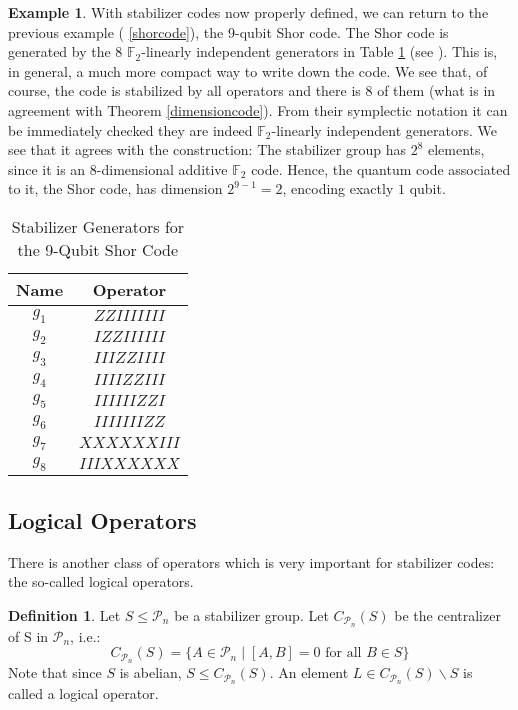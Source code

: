 \documentclass[12pt,a4paper,BCOR15mm,twoside,DIV12]{article}
\def\P{\mathcal{P}}
\def\F{\mathbb{F}}
\theoremstyle{definition}
\newtheorem{ex}[Satz]{Example}
\newtheorem{defn}[Satz]{Definition}
\begin{document}
\begin{ex}\label{shorstab}
With stabilizer codes now properly defined, we can return to the previous example ( \ref{shorcode}), the 9-qubit Shor code. The Shor code is generated by the 8 $\F_2$-linearly independent generators in Table \ref{shorgenerators} (see \cite{NC}). This is, in general, a much more compact way to write down the code. We see that, of course, the code is stabilized by all operators and there is 8 of them (what is in agreement with Theorem  \ref{dimensioncode}). From their symplectic notation it can be immediately checked they are indeed $\F_2$-linearly independent generators.
We see that it agrees with the construction: The stabilizer group has $2^8$ elements, since it is an $8$-dimensional additive $\F_2$ code. Hence, the quantum code associated to it, the Shor code, has dimension $2^{9-1} = 2$, encoding exactly $1$ qubit.
\begin{table}[h]
\centering 
\begin{tabular}{|c|c|}
\hline
Name & Operator \\ \hline
$g_1$ & $ZZIIIIIII$ \\ \hline
$g_2$ & $IZZIIIIII$ \\ \hline
$g_3$ & $IIIZZIIII$ \\ \hline
$g_4$ & $IIIIZZIII$ \\ \hline
$g_5$ & $IIIIIIZZI$ \\ \hline
$g_6$ & $IIIIIIIZZ$ \\ \hline
$g_7$ & $XXXXXXIII$ \\ \hline
$g_8$ & $IIIXXXXXX$ \\ \hline
\end{tabular}
\caption{ Stabilizer Generators for the 9-Qubit Shor Code}
\label{shorgenerators}
\end{table}
\end{ex}

\subsection{Logical Operators}
There is another class of operators which is very important for stabilizer codes: the so-called logical operators. 

\begin{defn}
Let $S \leq \P_n$ be a stabilizer group. Let $C_{\P_n}(S)$ be the centralizer of S in $\P_n$,  i.e.:
\[ C_{\P_n}(S) = \{ A \in \P_n \mid [A,B] = 0 \text{ for all } B \in S \} \]
Note that since $S$ is abelian, $S \leq C_{\P_n}(S)$. An element $L \in C_{\P_n}(S) \backslash S$ is called a logical operator.
\end{defn}
\end{document}
